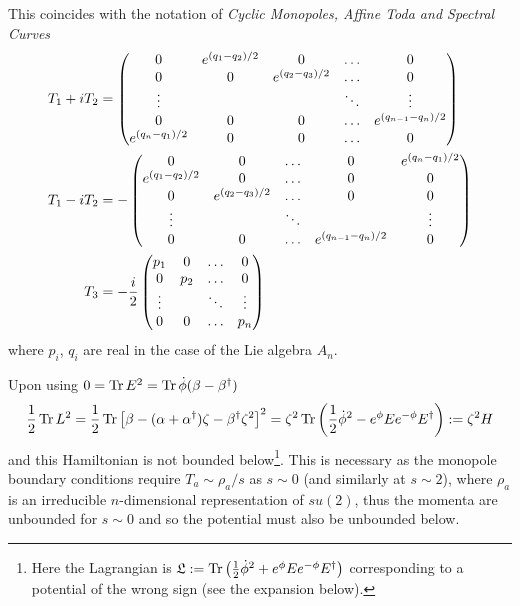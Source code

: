 \documentclass{article}
\begin{document}
\begin{remark}
This coincides with the notation of \emph{Cyclic Monopoles, Affine Toda and Spectral Curves} 
\cite{Braden2011}
\begin{align}
T_1+iT_2&=\begin{pmatrix} 0&e\sp{(q_1-q_2)/2}&0&\ldots&0\\
0&0&e\sp{(q_2-q_3)/2}&\ldots&0\\
\vdots&&&\ddots&\vdots\\
0&0&0&\ldots&e\sp{(q_{n-1}-q_n)/2}\\
e\sp{(q_n-q_1)/2}&0&0&\ldots&0
\end{pmatrix}\\
T_1-iT_2&=-\begin{pmatrix}0&0&\ldots&0&e\sp{(q_n-q_1)/2}\\
e\sp{(q_1-q_2)/2}&0&\ldots&0&0\\
0&e\sp{(q_2-q_3)/2}&\ldots&0&0\\
\vdots&&\ddots&&\vdots\\
0&0&\ldots&e\sp{(q_{n-1}-q_n)/2}&0
\end{pmatrix}\\
T_3&=-\frac{i}{2}\begin{pmatrix} p_1&0&\ldots&0\\
0&p_2&\ldots&0\\
\vdots&&\ddots&\vdots\\
0&0&\ldots&p_n
\end{pmatrix}
\end{align}
where $p_i$, $q_i$ are real in the case of the Lie algebra $A_n$. 
\end{remark}
Upon using $0=\operatorname{Tr} E^2=\operatorname{Tr} \dot \phi(\beta-\beta\sp\dagger)$
$$\frac12\operatorname{Tr} L^2=\frac12\operatorname{Tr}\left[\beta -(\alpha+\alpha\sp\dagger)\zeta-\beta\sp\dagger \zeta^2\right]^2
=\zeta^2\operatorname{Tr}\left(\frac12 {\dot\phi}^2 -e^{\phi}E  e^{-\phi} E\sp\dagger \right):=\zeta^2 H
$$
and this Hamiltonian is not bounded below\footnote{Here the Lagrangian is
	$\mathfrak{L}:=\operatorname{Tr}\left(\frac12 {\dot\phi}^2 +e^{\phi}E  e^{-\phi} E\sp\dagger \right)$ corresponding to a potential of the wrong sign (see the expansion below).}. This is necessary as the monopole boundary conditions require $T_a\sim \rho_a/s $ as $s\sim 0$ (and similarly at $s\sim 2$), where $\rho_a$
is an irreducible $n$-dimensional representation of $su(2)$, thus the momenta are unbounded for
$s\sim 0$ and so the potential must also be unbounded below.
\end{document}

